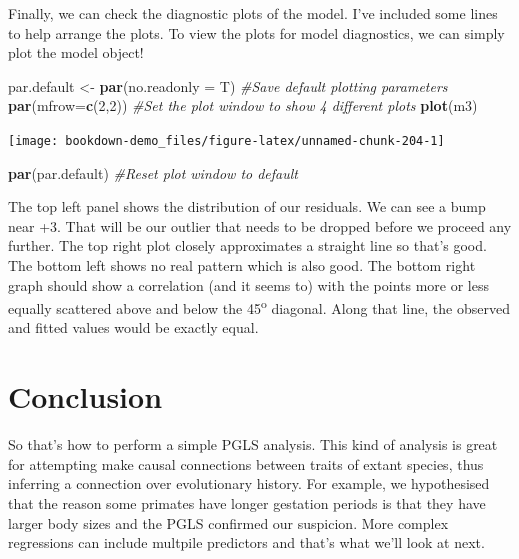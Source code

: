 \documentclass[
]{book}
\newenvironment{Shaded}{\begin{snugshade}}{\end{snugshade}}
\newcommand{\CommentTok}[1]{\textcolor[rgb]{0.56,0.35,0.01}{\textit{#1}}}
\newcommand{\DataTypeTok}[1]{\textcolor[rgb]{0.13,0.29,0.53}{#1}}
\newcommand{\DecValTok}[1]{\textcolor[rgb]{0.00,0.00,0.81}{#1}}
\newcommand{\KeywordTok}[1]{\textcolor[rgb]{0.13,0.29,0.53}{\textbf{#1}}}
\newcommand{\NormalTok}[1]{#1}
\newcommand{\StringTok}[1]{\textcolor[rgb]{0.31,0.60,0.02}{#1}}
\begin{document}
Finally, we can check the diagnostic plots of the model. I've included some lines to help arrange the plots. To view the plots for model diagnostics, we can simply plot the model object!

\begin{Shaded}
\begin{Highlighting}[]
\NormalTok{par.default \textless{}{-}}\StringTok{ }\KeywordTok{par}\NormalTok{(}\DataTypeTok{no.readonly =}\NormalTok{ T) }\CommentTok{\#Save default plotting parameters}
\KeywordTok{par}\NormalTok{(}\DataTypeTok{mfrow=}\KeywordTok{c}\NormalTok{(}\DecValTok{2}\NormalTok{,}\DecValTok{2}\NormalTok{)) }\CommentTok{\#Set the plot window to show 4 different plots}
\KeywordTok{plot}\NormalTok{(m3)}
\end{Highlighting}
\end{Shaded}

\begin{center}\texttt{[image: bookdown-demo\_files/figure-latex/unnamed-chunk-204-1]} \end{center}

\begin{Shaded}
\begin{Highlighting}[]
\KeywordTok{par}\NormalTok{(par.default) }\CommentTok{\#Reset plot window to default}
\end{Highlighting}
\end{Shaded}

The top left panel shows the distribution of our residuals. We can see a bump near +3. That will be our outlier that needs to be dropped before we proceed any further. The top right plot closely approximates a straight line so that's good. The bottom left shows no real pattern which is also good. The bottom right graph should show a correlation (and it seems to) with the points more or less equally scattered above and below the 45\textsuperscript{o} diagonal. Along that line, the observed and fitted values would be exactly equal.

\hypertarget{conclusion}{%
\section{Conclusion}\label{conclusion}}

So that's how to perform a simple PGLS analysis. This kind of analysis is great for attempting make causal connections between traits of extant species, thus inferring a connection over evolutionary history. For example, we hypothesised that the reason some primates have longer gestation periods is that they have larger body sizes and the PGLS confirmed our suspicion. More complex regressions can include multpile predictors and that's what we'll look at next.
\end{document}
